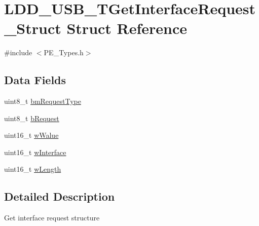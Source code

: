 \hypertarget{struct_l_d_d___u_s_b___t_get_interface_request___struct}{\section{L\-D\-D\-\_\-\-U\-S\-B\-\_\-\-T\-Get\-Interface\-Request\-\_\-\-Struct Struct Reference}
\label{struct_l_d_d___u_s_b___t_get_interface_request___struct}
}


{\ttfamily \#include $<$P\-E\-\_\-\-Types.\-h$>$}

\subsection*{Data Fields}
\begin{DoxyCompactItemize}
\item 
uint8\-\_\-t \hyperlink{struct_l_d_d___u_s_b___t_get_interface_request___struct_a2b04fcd64b22914d50af67b1b44dcb36}{bm\-Request\-Type}
\item 
uint8\-\_\-t \hyperlink{struct_l_d_d___u_s_b___t_get_interface_request___struct_a322309595b9cbe6bb0a391d463138e3d}{b\-Request}
\item 
uint16\-\_\-t \hyperlink{struct_l_d_d___u_s_b___t_get_interface_request___struct_a48bcaf6af044e3e9669f5ea634a2b9fe}{w\-Walue}
\item 
uint16\-\_\-t \hyperlink{struct_l_d_d___u_s_b___t_get_interface_request___struct_ac3dc3f80a292a73950254f8ce4c99a73}{w\-Interface}
\item 
uint16\-\_\-t \hyperlink{struct_l_d_d___u_s_b___t_get_interface_request___struct_a2aa1550fc5e72002a94c74ea0957ec74}{w\-Length}
\end{DoxyCompactItemize}


\subsection{Detailed Description}
Get interface request structure 

